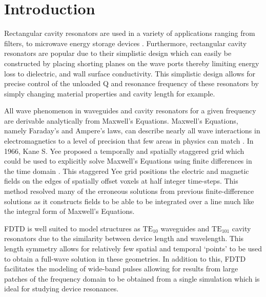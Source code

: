 \section{Introduction}
\label{sec:intro}
Rectangular cavity resonators are used in a variety of applications ranging from filters, to microwave energy storage devices \cite{pozar2011microwave}. Furthermore, rectangular cavity resonators are popular due to their simplistic design which can easily be constructed by placing shorting planes on the wave ports thereby limiting energy loss to dielectric, and wall surface conductivity\cite{pozar2011microwave}. This simplistic design allows for precise control of the unloaded Q and resonance frequency of these resonators by simply changing material properties and cavity length for example.

All wave phenomenon in waveguides and cavity resonators for a given frequency are derivable analytically from Maxwell's Equations. Maxwell's Equations, namely Faraday's and Ampere's laws, can describe nearly all wave interactions in electromagnetics to a level of precision that few areas in physics can match \cite{rothlecnotes}. In 1966, Kane S. Yee proposed a temporally and spatially staggered grid which could be used to explicitly solve Maxwell's Equations using finite differences in the time domain \cite{yee}. This staggered Yee grid positions the electric and magnetic fields on the edges of spatially offset voxels at half integer time-steps\cite{yee}. This method resolved many of the erroneous solutions from previous finite-difference solutions as it constructs fields to be able to be integrated over a line\cite{rothlecnotes} much like the integral form of Maxwell's Equations.

FDTD is well suited to model structures as $\mathrm{TE_{10}}$ waveguides and $\mathrm{TE_{101}}$ cavity resonators due to the similarity between device length and wavelength. This length symmetry allows for relatively few spatial and temporal `points' to be used to obtain a full-wave solution in these geometries. In addition to this, FDTD facilitates the modeling of wide-band pulses allowing for results from large patches of the frequency domain to be obtained from a single simulation which is ideal for studying device resonances.